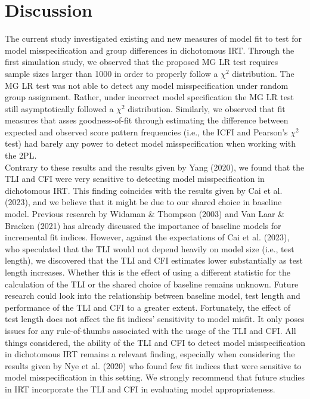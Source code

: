 \documentclass[Royal,sageapa,times,doublespace]{sagej}
\begin{document}
\section{\centering Discussion}

The current study investigated existing and new measures of model fit to test for model misspecification and group differences in dichotomous IRT. Through the first simulation study, we observed that the proposed MG LR test requires sample sizes larger than 1000 in order to properly follow a $\chi^2$ distribution. The MG LR test was not able to detect any model misspecification under random group assignment. Rather, under incorrect model specification the MG LR test still asymptotically followed a $\chi^2$ distribution. Similarly, we observed that fit measures that asses goodness-of-fit through estimating the difference between expected and observed score pattern frequencies (i.e., the ICFI and Pearson's $\chi^2$ test) had barely any power to detect model misspecification when working with the 2PL. \\
\indent Contrary to these results and the results given by Yang (2020), we found that the TLI and CFI were very sensitive to detecting model misspecification in dichotomous IRT. This finding coincides with the results given by Cai et al. (2023), and we believe that it might be due to our shared choice in baseline model. Previous research by Widaman \& Thompson (2003) and Van Laar \& Braeken (2021) has already discussed the importance of baseline models for incremental fit indices. However, against the expectations of Cai et al. (2023), who speculated that the TLI would not depend heavily on model size (i.e., test length), we discovered that the TLI and CFI estimates lower substantially as test length increases. Whether this is the effect of using a different statistic for the calculation of the TLI or the shared choice of baseline remains unknown. Future research could look into the relationship between baseline model, test length and performance of the TLI and CFI to a greater extent. Fortunately, the effect of test length does not affect the fit indices' sensitivity to model misfit. It only poses issues for any rule-of-thumbs associated with the usage of the TLI and CFI. All things considered, the ability of the TLI and CFI to detect model misspecification in dichotomous IRT remains a relevant finding, especially when considering the results given by Nye et al. (2020) who found few fit indices that were sensitive to model misspecification in this setting. We strongly recommend that future studies in IRT incorporate the TLI and CFI in evaluating model appropriateness. \\
\end{document}

